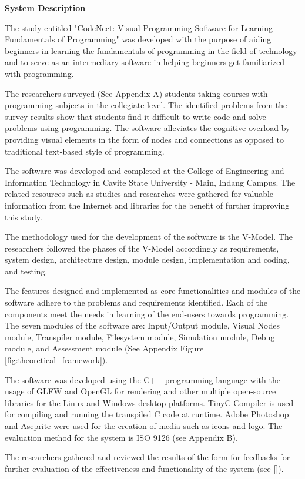 \flushleft
\textbf{System Description}
\justifying

\parx
The study entitled "CodeNect: Visual Programming Software for Learning
Fundamentals of Programming" was developed with the purpose of aiding beginners
in learning the fundamentals of programming in the field of technology and to serve
as an intermediary software in helping beginners get familiarized with programming.

\parx
The researchers surveyed (See Appendix A) students taking
courses with programming subjects in the collegiate level. The identified
problems from the survey results show that students find it difficult to write
code and solve problems using programming. The software alleviates the
cognitive overload by providing visual elements in the form of nodes and
connections as opposed to traditional text-based style of programming.

\parx
The software was developed and completed at the College of Engineering and
Information Technology in Cavite State University - Main, Indang Campus. The
related resources such as studies and researches were gathered for valuable
information from the Internet and libraries for the benefit of further improving
this study.

\parx
The methodology used for the development of the software is the V-Model. The
researchers followed the phases of the V-Model accordingly as requirements,
system design, architecture design, module design, implementation and coding,
and testing.

\parx
The features designed and implemented as core functionalities and modules of the
software adhere to the problems and requirements identified. Each of the components
meet the needs in learning of the end-users towards programming. The seven modules
of the software are: Input/Output module, Visual Nodes module, Transpiler module,
Filesystem module, Simulation module, Debug module, and Assessment module
(See Appendix Figure \ref{fig:theoretical_framework}).

\parx
The software was developed using the C++ programming language with the usage of
GLFW and OpenGL for rendering and other multiple open-source libraries for the
Linux and Windows desktop platforms. TinyC Compiler is used for compiling and
running the transpiled C code at runtime. Adobe Photoshop and Aseprite were
used for the creation of media such as icons and logo. The evaluation method
for the system is ISO 9126 (see Appendix B).

\parx
The researchers gathered and reviewed the results of the form for feedbacks for
further evaluation of the effectiveness and functionality of the system (see \ref{}).
